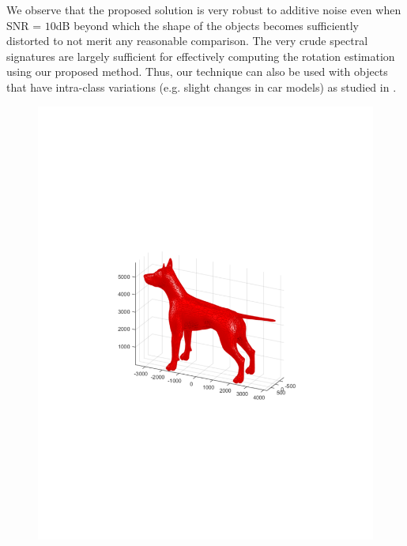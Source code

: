 \documentclass{UCF_ETD}
\begin{document}
We observe that the proposed solution is very robust to additive noise even when SNR = $10$dB beyond which the shape of the objects becomes sufficiently distorted to not merit any reasonable comparison. The very crude spectral signatures are largely sufficient for effectively computing the rotation estimation using our proposed method. Thus, our technique can also be used with objects that have  intra-class variations (e.g. slight changes in car models) as studied in \cite{Salah2013}.

\begin{figure}[H] 
\begin{center}
\includegraphics[scale=0.5]{RobustRegistration/Dog}

\end{center}
\end{figure}
\end{document}
